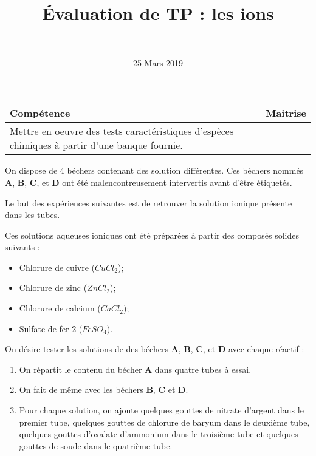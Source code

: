 \documentclass[a4paper,11pt]{exam}
\author{\ }
\date{25 Mars 2019}
\title{\'Evaluation de TP : les ions}
\begin{document}
%	
\maketitle
	
\begin{small}
	\begin{center}
		\begin{tabular}{|@{\ }l@{}|@{\ }c@{\ }|}
			\hline
			\textbf{Compétence} & \textbf{Maitrise} \\
			\hline
			Mettre en oeuvre des tests caractéristiques d’espèces chimiques à partir d’une banque fournie. \ &  \ \ \ \\
			\hline
		\end{tabular}
	\end{center}
\end{small}	

On dispose de 4 béchers contenant des solution différentes. Ces béchers nommés $\mathbf{A}$, $\mathbf{B}$, $\mathbf{C}$, et $\mathbf{D}$ ont été malencontreusement intervertis avant d'être étiquetés. 

Le but des expériences suivantes est de retrouver la solution ionique présente dans les tubes.

Ces solutions aqueuses ioniques ont été préparées à partir des composés solides suivants :

\begin{itemize}
	\item Chlorure de cuivre ($CuCl_2 $);
	\item Chlorure de zinc ($ZnCl_2 $);
	\item Chlorure de calcium ($CaCl_2 $);
	\item Sulfate de fer 2 ($FeSO_4 $).
\end{itemize}


On désire tester les solutions de des béchers $\mathbf{A}$, $\mathbf{B}$, $\mathbf{C}$, et $\mathbf{D}$ avec chaque réactif :

\begin{enumerate}
	\item On répartit le contenu du bécher $\mathbf{A}$ dans quatre tubes à essai.
	\item On fait de même avec les béchers $\mathbf{B}$, $\mathbf{C}$ et $\mathbf{D}$.
	\item Pour chaque solution, on ajoute quelques gouttes de nitrate d'argent  dans le premier tube, quelques gouttes de chlorure de baryum dans le deuxième tube, quelques gouttes d'oxalate d'ammonium dans le troisième tube et quelques gouttes de soude dans le quatrième tube.
\end{enumerate}
\end{document}

